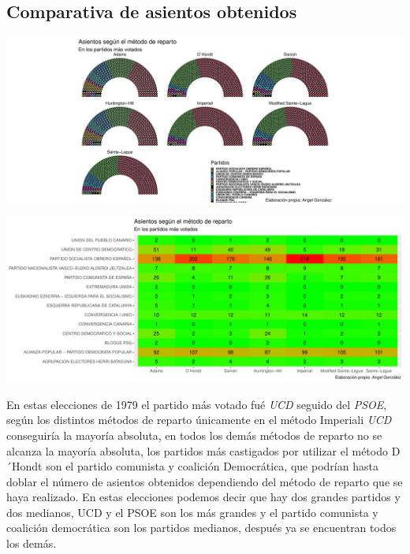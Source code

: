 \documentclass[12pt,a4paper,]{book}
\numberwithin{dummy}{section}
\theoremstyle{ocrenumbox}
\theoremstyle{blacknumex}
\theoremstyle{blacknumbox}
\theoremstyle{ocrenum}
\theoremstyle{ocrenum}
\begin{document}
\hypertarget{comparativa-de-asientos-obtenidos-1}{%
\subsection{Comparativa de asientos
obtenidos}\label{comparativa-de-asientos-obtenidos-1}}

\begin{center}\includegraphics[width=1\linewidth]{figurasR/unnamed-chunk-79-1} \end{center}

\begin{center}\includegraphics[width=1\linewidth]{figurasR/unnamed-chunk-79-2} \end{center}

En estas elecciones de 1979 el partido más votado fué \emph{UCD} seguido
del \emph{PSOE}, según los distintos métodos de reparto únicamente en el
método Imperiali \emph{UCD} conseguiría la mayoría absoluta, en todos
los demás métodos de reparto no se alcanza la mayoría absoluta, los
partidos más castigados por utilizar el método D´Hondt son el partido
comunista y coalición Democrática, que podrían hasta doblar el número de
asientos obtenidos dependiendo del método de reparto que se haya
realizado. En estas elecciones podemos decir que hay dos grandes
partidos y dos medianos, UCD y el PSOE son los más grandes y el partido
comunista y coalición democrática son los partidos medianos, después ya
se encuentran todos los demás.
\end{document}
